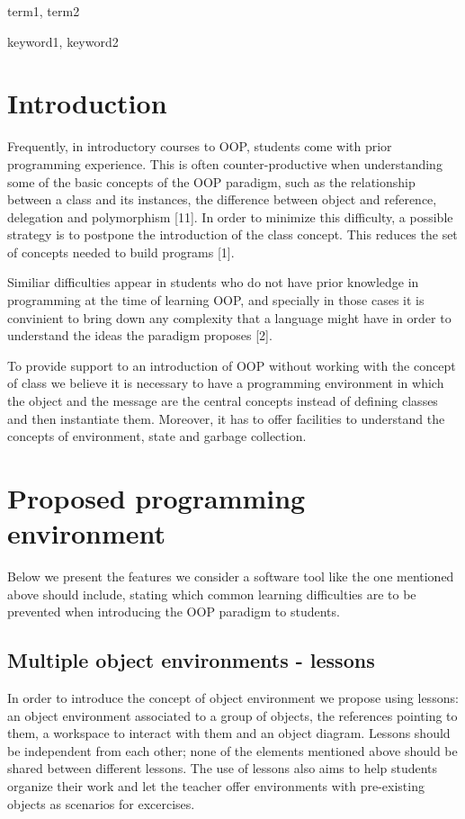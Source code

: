 \documentclass{sigplanconf}
\begin{document}

\terms
term1, term2

\keywords
keyword1, keyword2

\section{Introduction}

Frequently, in introductory courses to OOP, students come with prior programming experience. This is often counter-productive when understanding some of the basic concepts of the OOP paradigm, such as the relationship between a class and its instances, the difference between object and reference, delegation and polymorphism [11]. In order to minimize this difficulty, a possible strategy is to postpone the introduction of the class concept. This reduces the set of concepts needed to build programs [1]. 

Similiar difficulties appear in students who do not have prior knowledge in programming at the time of learning OOP, and specially in those cases it is convinient to bring down any complexity that a language might have in order to understand the ideas the paradigm proposes [2].

To provide support to an introduction of OOP without working with the concept of class we believe it is necessary to have a programming environment in which the object and the message are the central concepts instead of defining classes and then instantiate them.
Moreover, it has to offer facilities to understand the concepts of environment, state and garbage collection.

\section{Proposed programming environment}

Below we present the features we consider a software tool like the one mentioned above should include, stating which common learning difficulties are to be prevented when introducing the OOP paradigm to students. 

\subsection{Multiple object environments - lessons}

In order to introduce the concept of object environment we propose using lessons: an object environment associated to a group of objects, the references pointing to them, a workspace to interact with them and an object diagram. Lessons should be independent from each other; none of the elements mentioned above should be shared between different lessons.
The use of lessons also aims to help students organize their work and let the teacher offer environments with pre-existing objects as scenarios for excercises.
\end{document}
